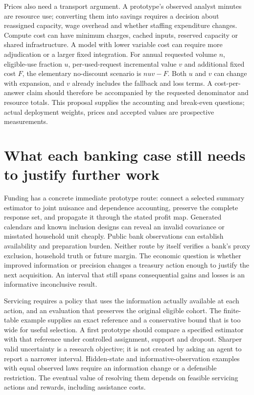 Prices also need a transport argument. A prototype's observed analyst minutes
are resource use; converting them into savings requires a decision about
reassigned capacity, wage overhead and whether staffing expenditure changes.
Compute cost can have minimum charges, cached inputs, reserved capacity or
shared infrastructure. A model with lower variable cost can require more
adjudication or a larger fixed integration. For annual requested volume $n$,
eligible-use fraction $u$, per-used-request incremental value $v$ and additional
fixed cost $F$, the elementary no-discount scenario is $nuv-F$. Both $u$ and
$v$ can change with expansion, and $v$ already includes the fallback and loss
terms. A cost-per-answer claim should therefore be accompanied by the requested
denominator and resource totals. This proposal supplies the accounting and
break-even questions; actual deployment weights, prices and accepted values
are prospective measurements. \citep{exec14_l8_design}

\section{What each banking case still needs to justify further work}
\label{exec14:l8-research}

Funding has a concrete immediate prototype route: connect a selected summary
estimator to joint nuisance and dependence accounting, preserve the complete
response set, and propagate it through the stated profit map. Generated
calendars and known inclusion designs can reveal an invalid covariance or
misstated household unit cheaply. Public bank observations can establish
availability and preparation burden. Neither route by itself verifies a bank's
proxy exclusion, household truth or future margin. The economic question is
whether improved information or precision changes a treasury action enough to
justify the next acquisition. An interval that still spans consequential gains
and losses is an informative inconclusive result.

Servicing requires a policy that uses the information actually available at
each action, and an evaluation that preserves the original eligible cohort.
The finite-table example supplies an exact reference and a conservative bound
that is too wide for useful selection. A first prototype should compare a
specified estimator with that reference under controlled assignment, support
and dropout. Sharper valid uncertainty is a research objective; it is not
created by asking an agent to report a narrower interval. Hidden-state and
informative-observation examples with equal observed laws require an information
change or a defensible restriction. The eventual value of resolving them depends
on feasible servicing actions and rewards, including assistance costs.

